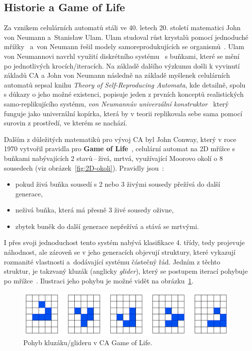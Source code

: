 \subsection*{Historie a Game of Life}
Za vznikem celulárních automatů stáli ve 40. letech 20. století matematici John von Neumann a~Stanisław Ulam. Ulam studoval růst krystalů pomocí jednoduché mřížky~\cite{pickover2009math} a~von Neumann řešil modely samoreprodukujících se organismů~\cite{history_CA}. Ulam von Neumannovi navrhl využití diskrétního systému~\cite{schiff2011cellular} s buňkami, které se mění po jednotlivých krocích/iteracích. Na základě dalšího výzkumu došli k vyvinutí základů CA a John von Neumann následně na základě myšlenek celulárních automatů sepsal knihu \textit{Theory of Self-Reproducing Automata}, kde detailně, spolu s důkazy o jeho možné existenci, popisuje jeden z prvních konceptů realistických samo-replikujícího systému, \textit{von Neumannův univerzální konstruktor}~\cite{theory_neumann} který funguje jako univerzální kopírka, která by v teorii replikovala sebe sama pomocí surovin z prostředí, ve kterém se nachází. 

Dalším z důležitých matematiků pro vývoj CA byl John Conway, který v roce 1970 vytvořil pravidla pro \textbf{Game of Life}~\cite{history_CA}, celulární automat na 2D mřížce s buňkami nabývajících 2 stavů\,--\,živá, mrtvá, využívající Moorovo okolí o 8 sousedech (viz obrázek~\ref{fig:2D-okoli}). Pravidly jsou~\cite{Game_Of_Life}:
\begin{itemize}
    \item pokud živá buňka sousedí s 2 nebo 3 živými sousedy přežívá do další generace,
    \item neživá buňka, která má přesně 3 živé sousedy oživne,
    \item zbytek buněk do další generace nepřežívá a stává se mrtvými.
\end{itemize}
I přes svoji jednoduchost tento systém nabývá klasifikace 4. třídy, tedy projevuje náhodnost, ale zároveň se v jeho generacích objevují struktury, které vykazují rozmanité vlastnosti a~dodávající systému částečný řád. Jedním z těchto struktur, je takzvaný kluzák (anglicky \textit{glider}), který se postupem iterací pohybuje po mřížce~\cite{Game_Of_Life}. Ilustraci jeho pohybu je možné vidět na obrázku~\ref{fig:game_of_life}.
\begin{figure}[H]
    \centering
    \includegraphics[width=\textwidth]{obrazky-figures/ch2/GameOfLife.png}
    \caption{Pohyb kluzáku/glideru v CA Game of Life.}
    \label{fig:game_of_life}
\end{figure}

